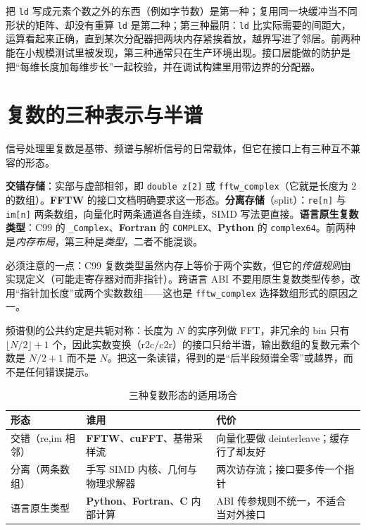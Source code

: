 \documentclass[12pt,a4paper,fontset=fandol]{ctexbook}
\newcommand{\Tp}[1]{\texttt{#1}}
\newcommand{\Lib}[1]{\textbf{#1}}
\newcommand{\Lang}[1]{\textsf{\bfseries #1}}
\newcommand{\CL}{\Lang{C}}
\newcommand{\FTN}{\Lang{Fortran}}
\newcommand{\PY}{\Lang{Python}}
\begin{document}
\begin{warning}[title={步长与尺寸的三种误用}]
把 \Tp{ld} 写成元素个数之外的东西（例如字节数）是第一种；复用同一块缓冲当不同形状的矩阵、却没有重算 \Tp{ld} 是第二种；第三种最阴：\Tp{ld} 比实际需要的间距大，运算看起来正确，直到某次分配器把两块内存紧挨着放，越界写进了邻居。前两种能在小规模测试里被发现，第三种通常只在生产环境出现。接口层能做的防护是把``每维长度加每维步长''一起校验，并在调试构建里用带边界的分配器。
\end{warning}

\section{复数的三种表示与半谱}

信号处理里复数是基带、频谱与解析信号的日常载体，但它在接口上有三种互不兼容的形态。

\textbf{交错存储}：实部与虚部相邻，即 \Tp{double z[2]} 或 \Tp{fftw\_complex}（它就是长度为 2 的数组）。\Lib{FFTW} 的接口文档明确要求这一形态。\textbf{分离存储}（split）：\Tp{re[n]} 与 \Tp{im[n]} 两条数组，向量化时两条通道各自连续，SIMD 写法更直接。\textbf{语言原生复数类型}：C99 的 \Tp{\_Complex}、\FTN{} 的 \Tp{COMPLEX}、\PY{} 的 \Tp{complex64}。前两种是\emph{内存布局}，第三种是\emph{类型}，二者不能混谈。

必须注意的一点：C99 复数类型虽然内存上等价于两个实数，但它的\emph{传值规则}由实现定义（可能走寄存器对而非指针）。跨语言 ABI 不要用原生复数类型传参，改用``指针加长度''或两个实数数组——这也是 \Tp{fftw\_complex} 选择数组形式的原因之一。

频谱侧的公共约定是共轭对称：长度为 $N$ 的实序列做 FFT，非冗余的 bin 只有 $\lfloor N/2 \rfloor + 1$ 个，因此实数变换（r2c/c2r）的接口只给半谱，输出数组的复数元素个数是 $N/2+1$ 而不是 $N$。把这一条读错，得到的是``后半段频谱全零''或越界，而不是任何错误提示。

\begin{table}[H]
\centering
\caption{三种复数形态的适用场合}
\label{tab:ch03-complex}
\small
\begin{tabular}{@{}>{\raggedright\arraybackslash}p{}
  >{\raggedright\arraybackslash}p{}
  >{\raggedright\arraybackslash}p{}@{}}
\toprule
形态 & 谁用 & 代价 \\
\midrule
交错（re,im 相邻） &
  \Lib{FFTW}、\Lib{cuFFT}、基带采样流 &
  向量化要做 deinterleave；缓存行了却友好 \\
分离（两条数组） &
  手写 SIMD 内核、几何与物理求解器 &
  两次访存流；接口要多传一个指针 \\
语言原生类型 &
  \PY{}、\FTN{}、\CL{} 内部计算 &
  ABI 传参规则不统一，不适合当对外接口 \\
\bottomrule
\end{tabular}
\end{table}
\end{document}
